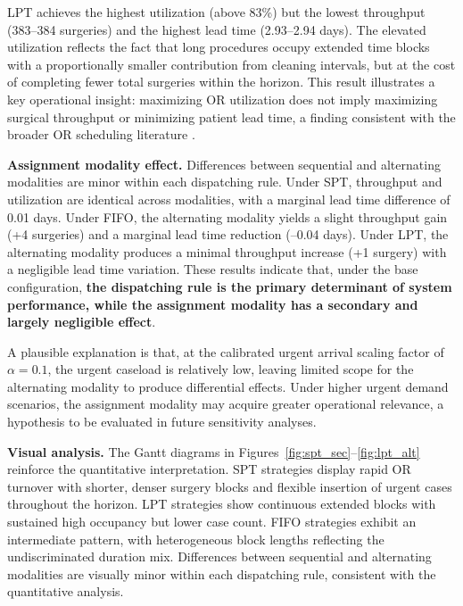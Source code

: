 \documentclass[sn-mathphys-num]{sn-jnl}
\begin{document}
LPT achieves the highest utilization (above 83\%) but the lowest
throughput (383--384 surgeries) and the highest lead time (2.93--2.94
days). The elevated utilization reflects the fact that long procedures
occupy extended time blocks with a proportionally smaller contribution
from cleaning intervals, but at the cost of completing fewer total
surgeries within the horizon. This result illustrates a key operational
insight: maximizing OR utilization does not imply maximizing
surgical throughput or minimizing patient lead time, a finding
consistent with the broader OR scheduling literature
\cite{cardoen2010operating,guerriero2011operational,may2011surgical}.

\textbf{Assignment modality effect.} Differences between sequential
and alternating modalities are minor within each dispatching rule.
Under SPT, throughput and utilization are identical across modalities,
with a marginal lead time difference of 0.01 days. Under FIFO,
the alternating modality yields a slight throughput gain (+4 surgeries)
and a marginal lead time reduction (--0.04 days). Under LPT, the
alternating modality produces a minimal throughput increase (+1 surgery)
with a negligible lead time variation. These results indicate that,
under the base configuration, \textbf{the dispatching rule is the
primary determinant of system performance, while the assignment
modality has a secondary and largely negligible effect}.

A plausible explanation is that, at the calibrated urgent arrival
scaling factor of $\alpha = 0.1$, the urgent caseload is relatively
low, leaving limited scope for the alternating modality to produce
differential effects. Under higher urgent demand scenarios, the
assignment modality may acquire greater operational relevance, a
hypothesis to be evaluated in future sensitivity analyses.

\textbf{Visual analysis.} The Gantt diagrams in
Figures~\ref{fig:spt_sec}--\ref{fig:lpt_alt} reinforce the
quantitative interpretation. SPT strategies display rapid OR
turnover with shorter, denser surgery blocks and flexible insertion
of urgent cases throughout the horizon. LPT strategies show
continuous extended blocks with sustained high occupancy but lower
case count. FIFO strategies exhibit an intermediate pattern, with
heterogeneous block lengths reflecting the undiscriminated duration
mix. Differences between sequential and alternating modalities are
visually minor within each dispatching rule, consistent with the
quantitative analysis.
\end{document}

